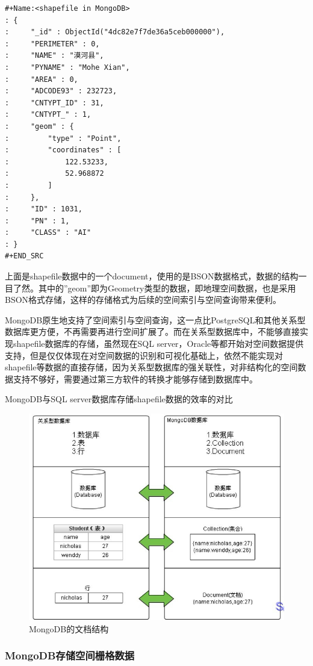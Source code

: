 \documentclass[master]{njnuthesis}
\begin{document}
\begin{verbatim}
#+Name:<shapefile in MongoDB>
: {
:     "_id" : ObjectId("4dc82e7f7de36a5ceb000000"),
:     "PERIMETER" : 0,
:     "NAME" : "漠河县",
:     "PYNAME" : "Mohe Xian",
:     "AREA" : 0,
:     "ADCODE93" : 232723,
:     "CNTYPT_ID" : 31,
:     "CNTYPT_" : 1,
:     "geom" : {
:         "type" : "Point",
:         "coordinates" : [
:             122.53233,
:             52.968872
:         ]
:     },
:     "ID" : 1031,
:     "PN" : 1,
:     "CLASS" : "AI"
: }
#+END_SRC
\end{verbatim}

上面是shapefile数据中的一个document，使用的是BSON数据格式，数据的结构一目了然。其中的''geom''即为Geometry类型的数据，即地理空间数据，也是采用BSON格式存储，这样的存储格式为后续的空间索引与空间查询带来便利。

MongoDB原生地支持了空间索引与空间查询，这一点比PostgreSQL和其他关系型数据库更方便，不再需要再进行空间扩展了。而在关系型数据库中，不能够直接实现shapefile数据库的存储，虽然现在SQL server，Oracle等都开始对空间数据提供支持，但是仅仅体现在对空间数据的识别和可视化基础上，依然不能实现对shapefile等数据的直接存储，因为关系型数据库的强关联性，对非结构化的空间数据支持不够好，需要通过第三方软件的转换才能够存储到数据库中。

MongoDB与SQL server数据库存储shapefile数据的效率的对比
\begin{figure}[!htb]
\begin{center}
\includegraphics[angle=0,width=1\textwidth]{pic//mongoDB_fileType.jpg}
\caption{MongoDB的文档结构}
\label{fig:1}
\end{center}
\end{figure}

\subsubsection{MongoDB存储空间栅格数据}
\end{document}
